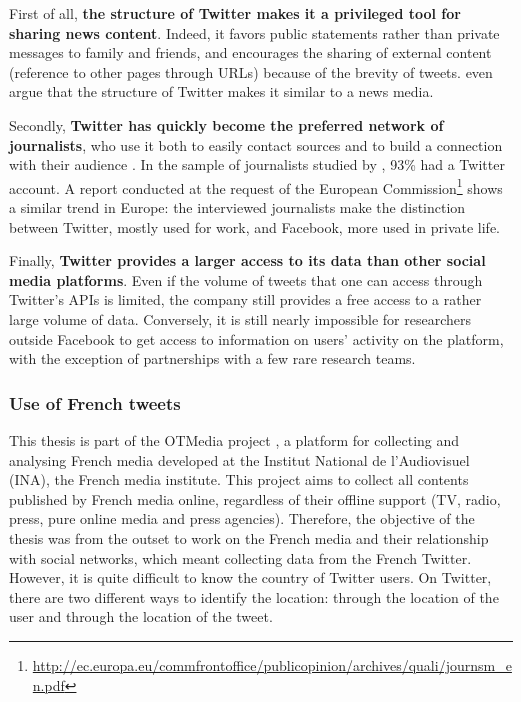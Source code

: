 	
	First of all, \textbf{the structure of Twitter makes it a privileged tool for sharing news content}. Indeed, it favors public statements rather than private messages to family and friends, and encourages the sharing of external content (reference to other pages through URLs) because of the brevity of tweets. \citet{kwak_twitter_2010} even argue that the structure of Twitter makes it similar to a news media.
	
	
	Secondly, \textbf{Twitter has quickly become the preferred network of journalists}, who use it both to easily contact sources and to build a connection with their audience \citep{swasy_little_2016}. In the sample of journalists studied by \citet{mcgregor_twitter_2018}, 93\% had a Twitter account. A report conducted at the request of the European Commission\footnote{\url{http://ec.europa.eu/commfrontoffice/publicopinion/archives/quali/journsm_en.pdf}} shows a similar trend in Europe: the interviewed journalists make the distinction between Twitter, mostly used for work, and Facebook, more used in private life.
	
	
	Finally, \textbf{Twitter provides a larger access to its data than other social media platforms}. Even if the volume of tweets that one can access through Twitter's APIs is limited, the company still provides a free access to a rather large volume of data. Conversely, it is still nearly
impossible for researchers outside Facebook to get access to information on users' activity on the platform, with the exception of partnerships with a few rare research teams.

\subsubsection{Use of French tweets}

This thesis is part of the OTMedia project \citep{herve2019otmedia}, a platform for collecting and analysing French media developed at the Institut National de l'Audiovisuel (INA), the French media institute. This project aims to collect all contents published by French media online, regardless of their offline support (TV, radio, press, pure online media and press agencies). Therefore, the objective of the thesis was from the outset to work on the French media and their relationship with social networks, which meant collecting data from the French Twitter. However, it is quite difficult to know the country of Twitter users. On Twitter, there are two different ways to identify the location: through the location of the user and through the location of the tweet. 

